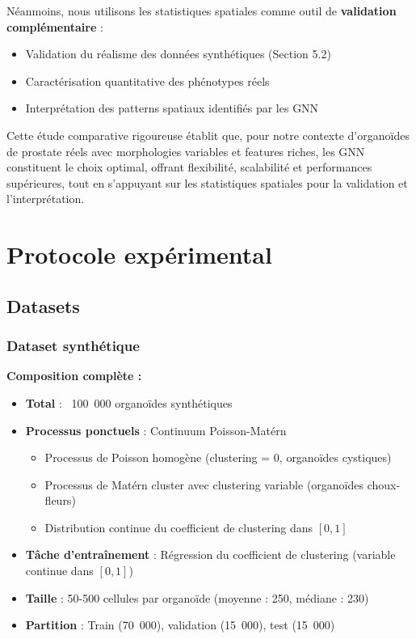 Néanmoins, nous utilisons les statistiques spatiales comme outil de \textbf{validation complémentaire} :
\begin{itemize}
    \item Validation du réalisme des données synthétiques (Section 5.2)
    \item Caractérisation quantitative des phénotypes réels
    \item Interprétation des patterns spatiaux identifiés par les GNN
\end{itemize}

Cette étude comparative rigoureuse établit que, pour notre contexte d'organoïdes de prostate réels avec morphologies variables et features riches, les GNN constituent le choix optimal, offrant flexibilité, scalabilité et performances supérieures, tout en s'appuyant sur les statistiques spatiales pour la validation et l'interprétation.

\section{Protocole expérimental}

\subsection{Datasets}

\subsubsection{Dataset synthétique}

\textbf{Composition complète :}
\begin{itemize}
    \item \textbf{Total} : ~100~000 organoïdes synthétiques
    \item \textbf{Processus ponctuels} : Continuum Poisson-Matérn
    \begin{itemize}
        \item Processus de Poisson homogène (clustering = 0, organoïdes cystiques)
        \item Processus de Matérn cluster avec clustering variable (organoïdes choux-fleurs)
        \item Distribution continue du coefficient de clustering dans $[0, 1]$
    \end{itemize}
    \item \textbf{Tâche d'entraînement} : Régression du coefficient de clustering (variable continue dans $[0,1]$)
    \item \textbf{Taille} : 50-500 cellules par organoïde (moyenne : 250, médiane : 230)
    \item \textbf{Partition} : Train (70~000), validation (15~000), test (15~000)
\end{itemize}

